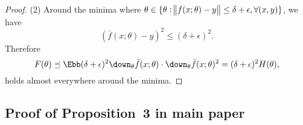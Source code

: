\documentclass{article}
\begin{document}
\begin{proof}
(2)
Around the minima where $\theta \in \{\theta : \norm{f(x;\theta)-y} \le \delta + \epsilon, \forall (x,y) \}$, we have
\begin{equation}
    (\bar{f}(x;\theta) - y)^2 \le (\delta+\epsilon)^2. 
\end{equation}
Therefore
\begin{equation}
    F(\theta) \preceq \Ebb (\delta+\epsilon)^2 \down_{\theta} \bar{f}(x;\theta) \cdot \down_{\theta} \bar{f}(x;\theta)^2 = (\delta+\epsilon)^2 H(\theta),
\end{equation}
holds almost everywhere around the minima.
\end{proof}

\subsection{Proof of Proposition~3 in main paper}
\end{document}
